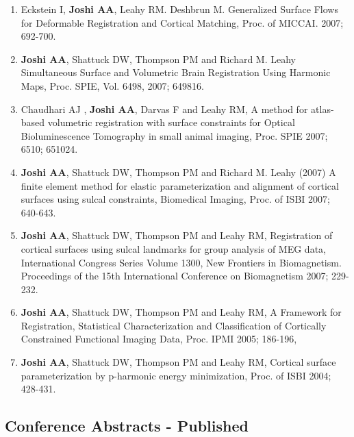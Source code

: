 \documentclass[overlapped,line,letterpaper]{res}
\begin{document}
\begin{resume}
\begin{enumerate}
    \item Eckstein I, \textbf{Joshi AA}, Leahy RM. Deshbrun M. {Generalized Surface Flows for Deformable Registration and Cortical Matching}, Proc. of MICCAI. 2007; 692-700.

    \item \textbf{Joshi AA}, Shattuck DW, Thompson PM and Richard M. Leahy {Simultaneous Surface and Volumetric Brain Registration Using Harmonic Maps}, Proc. SPIE, Vol. 6498, 2007; 649816.

    \item Chaudhari AJ , \textbf{Joshi AA}, Darvas F and Leahy RM, {A method for atlas-based volumetric registration with surface constraints for Optical Bioluminescence Tomography in small animal imaging}, Proc. SPIE 2007; 6510; 651024.

    \item \textbf{Joshi AA}, Shattuck DW, Thompson PM and Richard M. Leahy (2007) {A finite element method for elastic parameterization and alignment of cortical surfaces using sulcal constraints, Biomedical Imaging}, Proc. of ISBI 2007; 640-643. 

    \item \textbf{Joshi AA}, Shattuck DW, Thompson PM and Leahy RM, {Registration of cortical surfaces using sulcal landmarks for group analysis of MEG data}, International Congress Series Volume 1300, New Frontiers in Biomagnetism. Proceedings of the 15th International Conference on Biomagnetism 2007; 229-232.

    \item \textbf{Joshi AA}, Shattuck DW, Thompson PM and Leahy RM, {A Framework for Registration, Statistical Characterization and Classification of Cortically Constrained Functional Imaging Data}, Proc. IPMI 2005;  186-196,

    \item \textbf{Joshi AA}, Shattuck DW, Thompson PM and Leahy RM, {Cortical surface parameterization by p-harmonic energy minimization}, Proc. of ISBI 2004; 428-431.
\end{enumerate}


\subsection{Conference Abstracts - Published}
\begin{enumerate}


\end{enumerate}
\end{resume}
\end{document}
